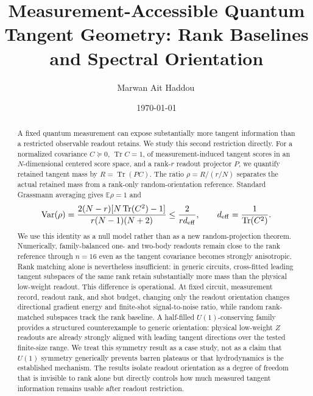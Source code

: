 \documentclass[aps,prx,reprint,superscriptaddress,nofootinbib,longbibliography]{revtex4-2}
\newcommand{\Tr}{\operatorname{Tr}}
\newcommand{\deff}{d_{\rm eff}}
\begin{document}
\title{Measurement-Accessible Quantum Tangent Geometry: Rank Baselines and Spectral Orientation}

\author{Marwan Ait Haddou\,}
\date{\today}

\begin{abstract}
A fixed quantum measurement can expose substantially more tangent information than a restricted observable readout retains. We study this second restriction directly. For a normalized covariance $C\succeq0$, $\Tr C=1$, of measurement-induced tangent scores in an $N$-dimensional centered score space, and a rank-$r$ readout projector $P$, we quantify retained tangent mass by $R=\Tr(PC)$. The ratio $\rho=R/(r/N)$ separates the actual retained mass from a rank-only random-orientation reference. Standard Grassmann averaging gives $\mathbb{E}\rho=1$ and
\begin{equation*}
\mathrm{Var}(\rho)=\frac{2(N-r)[N\Tr(C^2)-1]}{r(N-1)(N+2)}
\le \frac{2}{r\deff},
\qquad \deff=\frac{1}{\Tr(C^2)}.
\end{equation*}
We use this identity as a null model rather than as a new random-projection theorem. Numerically, family-balanced one- and two-body readouts remain close to the rank reference through $n=16$ even as the tangent covariance becomes strongly anisotropic. Rank matching alone is nevertheless insufficient: in generic circuits, cross-fitted leading tangent subspaces of the same rank retain substantially more mass than the physical low-weight readout. This difference is operational. At fixed circuit, measurement record, readout rank, and shot budget, changing only the readout orientation changes directional gradient energy and finite-shot signal-to-noise ratio, while random rank-matched subspaces track the rank baseline. A half-filled $U(1)$-conserving family provides a structured counterexample to generic orientation: physical low-weight $Z$ readouts are already strongly aligned with leading tangent directions over the tested finite-size range. We treat this symmetry result as a case study, not as a claim that $U(1)$ symmetry generically prevents barren plateaus or that hydrodynamics is the established mechanism. The results isolate readout orientation as a degree of freedom that is invisible to rank alone but directly controls how much measured tangent information remains usable after readout restriction.
\end{abstract}

\maketitle
\end{document}
